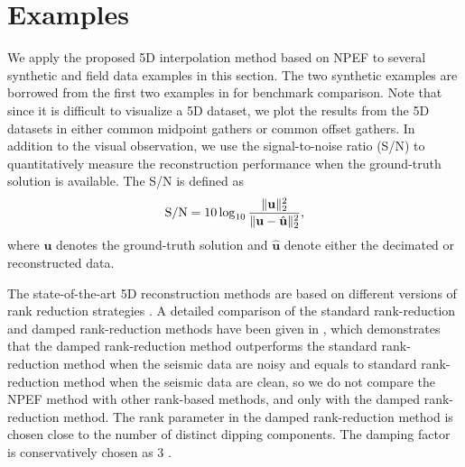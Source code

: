 %
%
%



\section{Examples}
We apply the proposed 5D interpolation method based on NPEF to several synthetic and field data examples in this section. The two synthetic examples are borrowed from the first two examples in \cite{yangkang2016irr5d} for benchmark comparison. Note that since it is difficult to visualize a 5D dataset, we plot the results from the 5D datasets in either common midpoint gathers or common offset gathers.  In addition to the visual observation, we use the signal-to-noise ratio (S/N) to quantitatively measure the reconstruction performance when the ground-truth solution is available. The S/N \cite[]{guochang2012,weilin2016dmssa} is defined as
\begin{equation}
\label{eq:snr}
\text{S/N}=10\log_{10}\frac{\Arrowvert \mathbf{u} \Arrowvert_2^2}{\Arrowvert \mathbf{u} -\hat{\mathbf{u}}\Arrowvert_2^2},
\end{equation}
where $\mathbf{u}$ denotes the ground-truth solution and $\hat{\mathbf{u}}$ denote either the decimated or reconstructed data. 

The state-of-the-art 5D reconstruction methods are based on different versions of rank reduction strategies \cite[]{kreimer2012,kreimer2013,jianjun2013,yangkang2020odrr,oboue2021geo2}. A detailed comparison of the standard rank-reduction and damped rank-reduction methods have been given in \cite{yangkang2016irr5d}, which demonstrates that the damped rank-reduction method outperforms the standard rank-reduction method when the seismic data are noisy and equals to standard rank-reduction method when the seismic data are clean, so we do not compare the NPEF method with other rank-based methods, and only with the damped rank-reduction method. The rank parameter in the damped rank-reduction method is chosen close to the number of distinct dipping components. The damping factor is conservatively chosen as 3 \cite[]{yangkang2016irr5d}.


